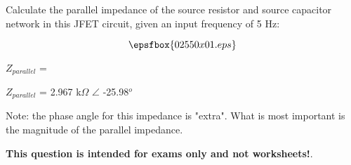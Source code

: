 

Calculate the parallel impedance of the source resistor and source capacitor network in this JFET circuit, given an input frequency of 5 Hz:

$$\epsfbox{02550x01.eps}$$

$Z_{parallel}$ = 







$Z_{parallel}$ = 2.967 k$\Omega$ $\angle$ -25.98$^{o}$ 

\vskip 10pt

Note: the phase angle for this impedance is "extra".  What is most important is the magnitude of the parallel impedance.







{\bf This question is intended for exams only and not worksheets!}.





